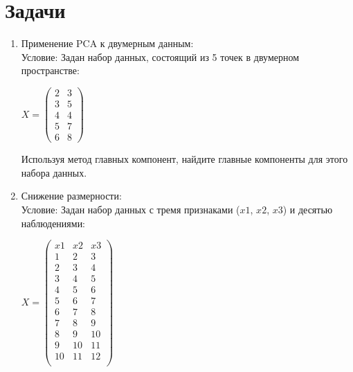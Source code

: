 \section{Задачи}
\begin{enumerate}
    \item
          Применение PCA к двумерным данным: \\
          Условие: Задан набор данных, состоящий из 5 точек в двумерном пространстве:  \\
          \begin{center}
              $X =
                  \begin{pmatrix}
                      2 & 3 \\
                      3 & 5 \\
                      4 & 4 \\
                      5 & 7 \\
                      6 & 8
                  \end{pmatrix}$\par
          \end{center}
          Используя метод главных компонент, найдите главные компоненты для этого набора данных.
    \item
          Снижение размерности: \\
          Условие: Задан набор данных с тремя признаками ($x1$, $x2$, $x3$) и десятью наблюдениями: \\
          \begin{center}
              $X =
                  \begin{pmatrix}
                      x1 & x2 & x3 \\
                      1  & 2  & 3  \\
                      2  & 3  & 4  \\
                      3  & 4  & 5  \\
                      4  & 5  & 6  \\
                      5  & 6  & 7  \\
                      6  & 7  & 8  \\
                      7  & 8  & 9  \\
                      8  & 9  & 10 \\
                      9  & 10 & 11 \\
                      10 & 11 & 12 \\
                  \end{pmatrix}$\par

\end{center}
\end{enumerate}
